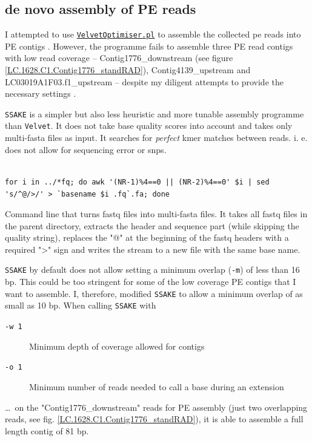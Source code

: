 \documentclass[a4paper,12pt,times,print,index,custombib,custommargin]{PhDThesisPSnPDF}\usepackage[]{graphicx}\usepackage[]{color}
\begin{document}
\FloatBarrier
\subsection{de novo assembly of PE reads}\label{ch:PE_read_assembly}

I attempted to use \href{http://www.vicbioinformatics.com/software.velvetoptimiser.shtml}{\texttt{VelvetOptimiser.pl}} to assemble the collected \gls{pe} reads into PE contigs \citep{Zerbino2008}. However, the programme fails to assemble three PE read contigs with low read coverage -- Contig1776\_downstream (see figure  \ref{LC.1628.C1.Contig1776_standRAD}), Contig4139\_upstream and LC03019A1F03.f1\_upstream -- despite my diligent attempts to provide the necessary settings \citep{Zerbino2010,Davey2012,Etter2011}.

\texttt{SSAKE} \citep{Warren2007} is a simpler but also less heuristic and more tunable assembly programme than \texttt{Velvet}. It does not take base quality scores into account and takes only multi-fasta files as input. It searches for \emph{perfect} \gls{kmer} matches between reads. i. e. does not allow for sequencing error or \glspl{snp}.

\begin{cmd}
\captionsetup{type=cmd} %
\begin{Verbatim}[fontsize=\scriptsize, formatcom=\color{darkgray}]

for i in ../*fq; do awk '(NR-1)%4==0 || (NR-2)%4==0' $i | sed 's/^@/>/' > `basename $i .fq`.fa; done
\end{Verbatim}
\caption[ fastq files into multi-fasta files]{Command line that turns fastq files into multi-fasta files. It takes all fastq files in the parent directory, extracts the header and sequence part (while skipping the quality string), replaces the "@" at the beginning of the fastq headers with a required ">" sign and writes the stream to a new file with the same base name.}
\label{fastq_to_fasta}
\end{cmd}

\texttt{SSAKE} by default does not allow setting a minimum overlap (\texttt{-m}) of less than 16 \gls{bp}. This could be too stringent for some of the low coverage PE contigs that I want to assemble. I, therefore, modified \texttt{SSAKE} to allow a minimum overlap of as small as 10 bp. When calling \texttt{SSAKE} with 
\begin{description}
\item[\texttt{-w 1}] Minimum depth of coverage allowed for contigs
\item[\texttt{-o 1}] Minimum number of reads needed to call a base during an extension
\end{description}
\dots ~on the "Contig1776\_downstream" reads for PE assembly (just two overlapping reads, see fig. \ref{LC.1628.C1.Contig1776_standRAD}), it is able to assemble a full length contig of 81 bp.
\end{document}
